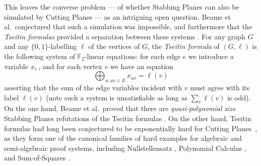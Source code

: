 \documentclass[11pt]{article}
\numberwithin{equation}{section}
\theoremstyle{definition}
\theoremstyle{plain}
\newcommand{\set}[1]{\{ #1 \}}
\begin{document}
This leaves the converse problem --- of whether Stabbing Planes can also be simulated by Cutting Planes --- as an intriguing open question.
Beame et al.~conjectured that such a simulation was impossible, and furthermore that the \emph{Tseitin formulas} provided a separation between these systems \cite{BeameFIKPPR18}.
For any graph $G$ and any $\set{0,1}$-labelling $\ell$ of the vertices of $G$, the \emph{Tseitin formula} of $(G, \ell)$ is the following system of $\mathbb{F}_2$-linear equations: for each edge $e$ we introduce a variable $x_e\,$, and for each vertex $v$ we have an equation
\[ \bigoplus_{u: uv \in E} x_{uv} = \ell(v)\]
asserting that the sum of the edge variables incident with $v$ must agree with its label $\ell(v)$ (note such a system is unsatisfiable as long as $\sum_v \ell(v)$ is odd).
On the one hand, Beame et al.~proved that there are \emph{quasi-polynomial size} Stabbing Planes refutations of the Tseitin formulas \cite{BeameFIKPPR18}.
On the other hand, Tseitin formulas had long been conjectured to be exponentially hard for Cutting Planes~\cite{CookCT87}, as they form one of the canonical families of hard examples for algebraic and semi-algebraic proof systems, including Nullstellensatz \cite{dima-nsatz}, Polynomial Calculus \cite{bgip}, and Sum-of-Squares \cite{dima-sos,Schoenebeck08}. 
\end{document}
